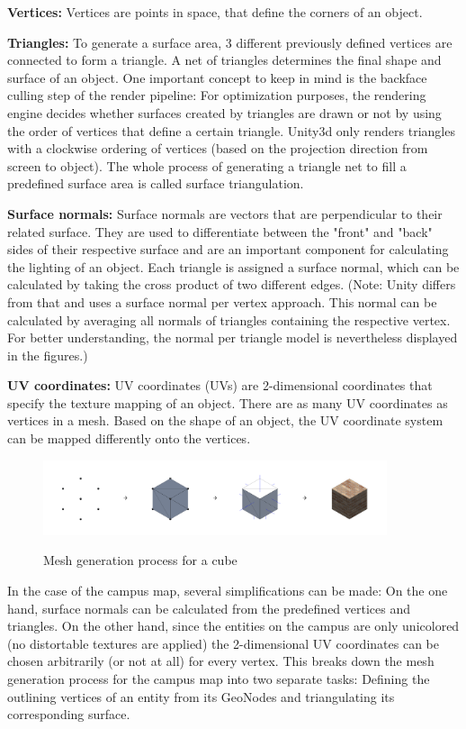 \textbf{Vertices:} Vertices are points in space, that define the corners of an object.

\textbf{Triangles:} To generate a surface area, 3 different previously defined vertices are connected to form a triangle. A net of triangles determines the final shape and surface of an object. One important concept to keep in mind is the backface culling step of the render pipeline: For optimization purposes, the rendering engine decides whether surfaces created by triangles are drawn or not by using the order of vertices that define a certain triangle. Unity3d only renders triangles with a clockwise ordering of vertices (based on the projection direction from screen to object). The whole process of generating a triangle net to fill a predefined surface area is called surface triangulation.

\textbf{Surface normals:} Surface normals are vectors that are perpendicular to their related surface. They are used to differentiate between the "front" and "back" sides of their respective surface and are an important component for calculating the lighting of an object. Each triangle is assigned a surface normal, which can be calculated by taking the cross product of two different edges. (Note: Unity differs from that and uses a surface normal per vertex approach. This normal can be calculated by averaging all normals of triangles containing the respective vertex. For better understanding, the normal per triangle model is nevertheless displayed in the figures.)

\textbf{UV coordinates:} UV coordinates (UVs) are 2-dimensional coordinates that specify the texture mapping of an object. There are as many UV coordinates as vertices in a mesh. Based on the shape of an object, the UV coordinate system can be mapped differently onto the vertices.

\begin{figure}[H]
	\centering
	\includegraphics[width=0.9\textwidth]{images/mesh_generation_process.png}\\
	\caption{Mesh generation process for a cube}
\end{figure}

In the case of the campus map, several simplifications can be made: On the one hand, surface normals can be calculated from the predefined vertices and triangles. On the other hand, since the entities on the campus are only unicolored (no distortable textures are applied) the 2-dimensional UV coordinates can be chosen arbitrarily (or not at all) for every vertex. This breaks down the mesh generation process for the campus map into two separate tasks: Defining the outlining vertices of an entity from its GeoNodes and triangulating its corresponding surface.

